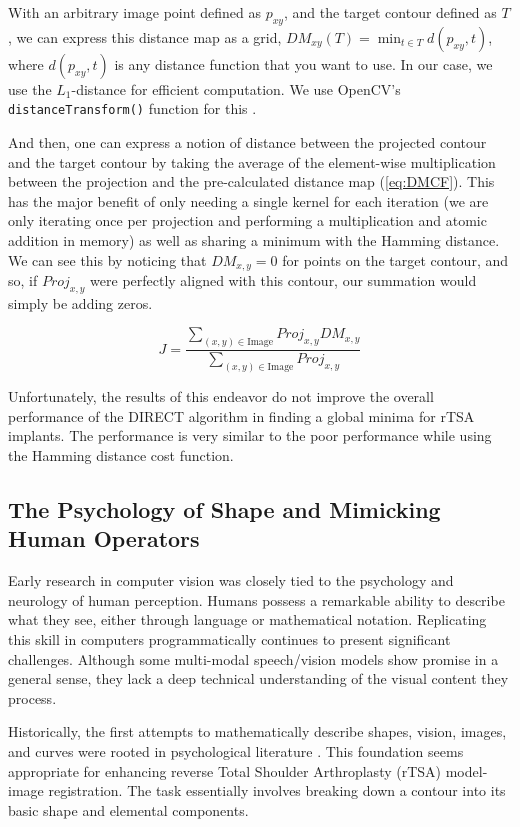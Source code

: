 With an arbitrary image point defined as $p_{xy}$, and the target contour defined as $T$, we can express this distance map as a grid, $\displaystyle DM_{xy}(T) = \min_{t\in T}d(p_{xy},t)$, where $d(p_{xy},t)$ is any distance function that you want to use. In our case, we use the $L_{1}$-distance for efficient computation. We use OpenCV's \texttt{distanceTransform()} function for this \cite{bradskiOpenCVLibrary2000}.

And then, one can express a notion of distance between the projected contour and the target contour by taking the average of the element-wise multiplication between the projection and the pre-calculated distance map (\cref{eq:DMCF}).
This has the major benefit of only needing a single kernel for each iteration (we are only iterating once per projection and performing a multiplication and atomic addition in memory) as well as sharing a minimum with the Hamming distance.
We can see this by noticing that $DM_{x,y}=0$ for points on the target contour, and so, if $Proj_{x,y}$ were perfectly aligned with this contour, our summation would simply be adding zeros.

\begin{equation}
  \label{eq:DMCF}
  J = \dfrac{ \sum_{(x,y) \in \text{Image}} Proj_{x,y}DM_{x,y} }{\sum_{(x,y)\in \text{Image}}Proj_{x,y}}
\end{equation}

Unfortunately, the results of this endeavor do not improve the overall performance of the DIRECT algorithm in finding a global minima for rTSA implants.
The performance is very similar to the poor performance while using the Hamming distance cost function.

\subsection{The Psychology of Shape and Mimicking Human Operators}
Early research in computer vision was closely tied to the psychology and neurology of human perception.
Humans possess a remarkable ability to describe what they see, either through language or mathematical notation.
Replicating this skill in computers programmatically continues to present significant challenges.
Although some multi-modal speech/vision models show promise in a general sense, they lack a deep technical understanding of the visual content they process.

Historically, the first attempts to mathematically describe shapes, vision, images, and curves were rooted in psychological literature \cite{attneaveInformationalAspectsVisual1954,attneaveQuantitativeStudyShape1956,koenderinkStructureImages1984,koenderinkSurfaceShapeCurvature1992}.
This foundation seems appropriate for enhancing reverse Total Shoulder Arthroplasty (rTSA) model-image registration.
The task essentially involves breaking down a contour into its basic shape and elemental components.


